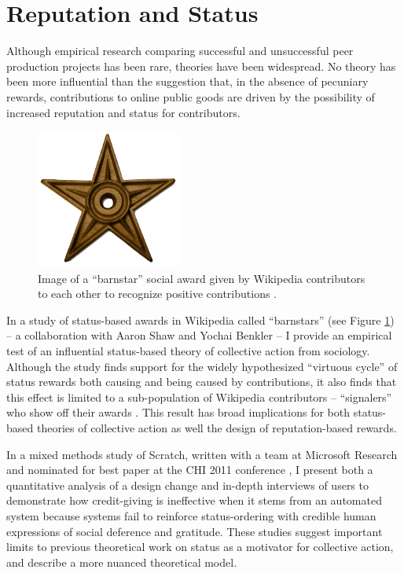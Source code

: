 \documentclass[10pt]{memoir}
\begin{document}
\section{Reputation and Status}

Although empirical research comparing successful and unsuccessful peer
production projects has been rare, theories have been widespread. No
theory has been more influential than the suggestion that, in the
absence of pecuniary rewards, contributions to online public goods are
driven by the possibility of increased reputation and status for
contributors.

\begin{figure}
 \vspace{-1em}
 \begin{centering}
 \includegraphics[width=1.9in]{figures/barnstar_alone.png}
 \caption{Image of a ``barnstar'' social award given by Wikipedia
   contributors to each other to recognize positive contributions .}
 \label{fig:barnstar}
 \end{centering}
 \vspace{-1em}
\end{figure}

In a study of status-based awards in Wikipedia called ``barnstars''
(see Figure \ref{fig:barnstar}) -- a collaboration with Aaron Shaw and
Yochai Benkler -- I provide an empirical test of an influential
status-based theory of collective action from sociology. Although the
study finds support for the widely hypothesized ``virtuous cycle'' of
status rewards both causing and being caused by contributions, it also
finds that this effect is limited to a sub-population of Wikipedia
contributors -- ``signalers'' who show off their awards
\cite{hill_status_2012}. This result has broad implications for both
status-based theories of collective action as well the design of
reputation-based rewards.

In a mixed methods study of Scratch, written with a team at Microsoft
Research and nominated for best paper at the CHI 2011 conference
\cite{monroy-hernandez_computers_2011}, I present both a quantitative
analysis of a design change and in-depth interviews of users to
demonstrate how credit-giving is ineffective when it stems from an
automated system because systems fail to reinforce status-ordering
with credible human expressions of social deference and
gratitude. These studies suggest important limits to previous
theoretical work on status as a motivator for collective action, and
describe a more nuanced theoretical model.
\end{document}
